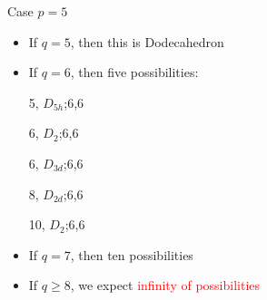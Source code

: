 \documentclass[%
pdf,
colorBG,
slideColor,
]{prosper}
\begin{document}
\begin{slide}{Case $p=5$}
\vspace{-4mm}
\begin{itemize}
\item If $q=5$, then this is Dodecahedron

\vspace{-1mm}

\item If $q=6$, then five possibilities:
\vspace{-1mm}
\begin{center}
\begin{minipage}{3.5cm}
\centering
{}\par
5, $D_{5h}$;6,6
\end{minipage}
\begin{minipage}{3.5cm}
\centering
{}\par
6, $D_2$;6,6
\end{minipage}
\begin{minipage}{3.5cm}
\centering
{}\par
6, $D_{3d}$;6,6
\end{minipage}
\begin{minipage}{3.5cm}
\centering
\vspace{-3mm}
\par
8, $D_{2d}$;6,6
\end{minipage}
\begin{minipage}{3.5cm}
\centering
\vspace{-3mm}
\par
10, $D_2$;6,6
\end{minipage}
\end{center}

\item If $q=7$, then ten possibilities

\item If $q \ge 8$, we expect \textcolor{red}{infinity of possibilities}

\end{itemize}
\end{slide}
\end{document}
